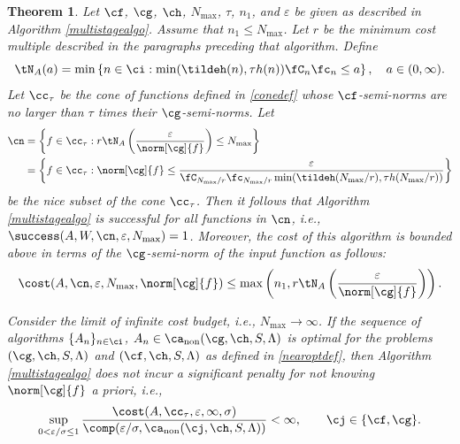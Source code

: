 \documentclass[]{elsarticle}
\DeclareMathOperator{\fix}{non}
\newtheorem{theorem}{Theorem}
\theoremstyle{definition}
\theoremstyle{remark}
\begin{document}
\begin{theorem}  \label{MultiStageThm}  Let  $\cf$, $\cg$, $\ch$, $N_{\max}$, $\tau$, $n_1$, and $\varepsilon$ be given as described in Algorithm \ref{multistagealgo}. Assume that $n_1 \le N_{\max}$. Let $r$ be the minimum cost multiple described in the paragraphs preceding that algorithm.  Define 
\begin{equation} \label{tNmindef}
\tN_A(a) = \min\left\{ n \in \ci : \min(\tildeh(n),\tau h(n))\fC_n\fc_n \le a \right\}, \quad a \in (0,\infty).
\end{equation}
Let $\cc_\tau$ be the cone of functions defined in \eqref{conedef} whose $\cf$-semi-norms are no larger than $\tau$ times their $\cg$-semi-norms.  Let
\begin{align} 
\nonumber
\cn &= \left \{ f \in \cc_\tau :r\tN_{A}\left(\frac{\varepsilon}{\norm[\cg]{f}} \right) \le N_{\max} \right\} \\
\label{nicefdefmulti}
&= \left \{ f \in \cc_\tau : \norm[\cg]{f} \le \frac{\varepsilon}{\fC_{N_{\max}/r} \fc_{N_{\max}/r} \min(\tildeh(N_{\max}/r),\tau h(N_{\max}/r))} \right\}
\end{align}
be the nice subset of the cone $\cc_\tau$.  Then it follows that Algorithm \ref{multistagealgo} is successful for all functions in $\cn$,  i.e.,  $\success(A,W,\cn,\varepsilon,N_{\max}) = 1$.  Moreover, the cost of this algorithm is bounded above in terms of the $\cg$-semi-norm of the input function as follows:
\begin{equation} \label{automultistagedetcost}
\cost(A,\cn,\varepsilon,N_{\max},\norm[\cg]{f})
\le \max \left(n_1, r\tN_{A}\left(\frac{\varepsilon}{\norm[\cg]{f}} \right) \right).
\end{equation}

Consider the limit of infinite cost budget, i.e., $N_{\max} \to \infty$.  If the sequence of algorithms $\{A_n\}_{n \in \ci}$, $A_n \in\ca_{\fix}(\cg,\ch,S,\Lambda)$  is optimal for the problems $(\cg,\ch,S,\Lambda)$ and $(\cf,\ch,S,\Lambda)$ as defined in \eqref{nearoptdef}, then Algorithm \ref{multistagealgo} does not incur a significant penalty for not knowing $\norm[\cg]{f}$ a priori, i.e.,
\begin{equation*} \label{multistagepenalty}
\sup_{0 < \varepsilon/\sigma \le 1} \frac{\cost(A,\cc_{\tau},\varepsilon,\infty,\sigma)} {\comp(\varepsilon/\sigma,\ca_{\fix}(\cj,\ch,S,\Lambda))} <\infty, \qquad \cj \in \{\cf,\cg\}.
\end{equation*}
\end{theorem}
\end{document}

